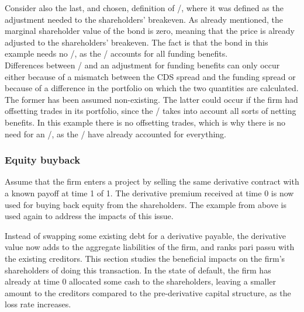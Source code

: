 \documentclass[main.tex]{subfiles}
\begin{document}
            Consider also the last, and chosen, definition of \FVA/,
            where it was defined as the adjustment needed to the shareholders' breakeven.
            As already mentioned, the marginal shareholder value of the bond is zero,
            meaning that the price is already adjusted to the shareholders' breakeven.
            The fact is that the bond in this example needs no \FVA/,
            as the \DVA/ accounts for all funding benefits.
            \\
            Differences between \DVA/ and an adjustment for funding benefits can only occur 
            either because of a mismatch between the CDS spread and the funding spread
            or because of a difference in the portfolio on which the two quantities are calculated. 
            The former has been assumed non-existing.
            The latter could occur if the firm had offsetting trades in its portfolio,
            since the \FVA/ takes into account all sorts of netting benefits.
            In this example there is no offsetting trades, 
            which is why there is no need for an \FVA/, as the \DVA/ have already accounted for everything.

        \subsubsection{Equity buyback}
            Assume that the firm enters a project 
            by selling the same derivative contract with a known payoff at time 1 of 1. 
            The derivative premium received at time 0 is now used for buying back equity from the shareholders. 
            The example from above is used again to address the impacts of this issue.

            Instead of swapping some existing debt for a derivative payable, 
            the derivative value now adds to the aggregate liabilities of the firm, 
            and ranks pari passu with the existing creditors.
            This section studies the beneficial impacts on the firm's shareholders of doing this transaction.
            In the state of default, the firm has already at time 0 allocated some cash to the shareholders, 
            leaving a smaller amount to the creditors compared to the pre-derivative capital structure, 
            as the loss rate increases.
\end{document}
